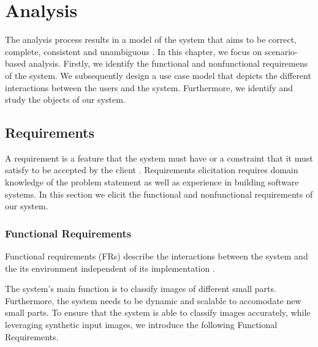 \chapter{Analysis}


The analysis process results in a model of the system that aims to be correct, complete, consistent and unambiguous \cite{bruegge2004object}. In this chapter, we focus on scenario-based analysis. Firstly, we identify the functional and nonfunctional requiremens of the system. We subsequently design a use case model that depicts the different interactions between the users and the system. Furthermore, we identify and study the objects of our system.

\section{Requirements}
A requirement is a feature that the system must have or a constraint that it must satisfy to be accepted by the client \cite{bruegge2004object}. Requirements elicitation requires domain knowledge of the problem statement as well as experience in building software systems. In this section we elicit the functional and nonfunctional requirements of our system.

\subsection{Functional Requirements}

Functional requirements (FRs) describe the interactions between the system and the its environment independent of its implementation \cite{bruegge2004object}.

The system's main function is to classify images of different small parts. Furthermore, the system needs to be dynamic and scalable to accomodate new small parts. To ensure that the system is able to classify images accurately, while leveraging synthetic input images, we introduce the following Functional Requirements.

